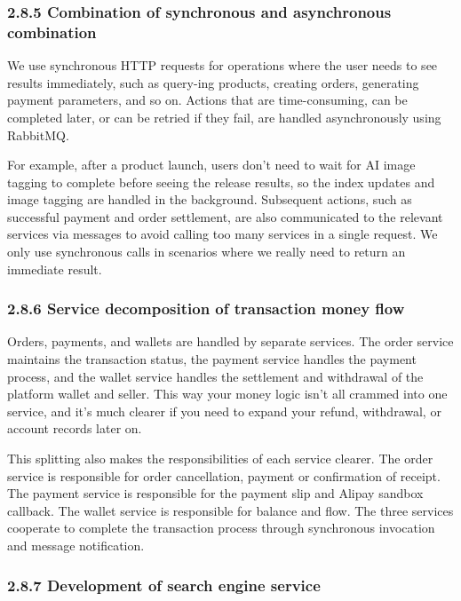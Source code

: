 \documentclass{article}
\begin{document}
\subsubsection{2.8.5 Combination of synchronous and asynchronous combination}

We use synchronous HTTP requests for operations where the user needs to see results immediately, such as query-ing products, creating orders, generating payment parameters, and so on. Actions that are time-consuming, can be completed later, or can be retried if they fail, are handled asynchronously using RabbitMQ.

For example, after a product launch, users don't need to wait for AI image tagging to complete before seeing the release results, so the index updates and image tagging are handled in the background. Subsequent actions, such as successful payment and order settlement, are also communicated to the relevant services via messages to avoid calling too many services in a single request. We only use synchronous calls in scenarios where we really need to return an immediate result.

\subsubsection{2.8.6 Service decomposition of transaction money flow}

Orders, payments, and wallets are handled by separate services. The order service maintains the transaction status, the payment service handles the payment process, and the wallet service handles the settlement and withdrawal of the platform wallet and seller. This way your money logic isn't all crammed into one service, and it's much clearer if you need to expand your refund, withdrawal, or account records later on.

This splitting also makes the responsibilities of each service clearer. The order service is responsible for order cancellation, payment or confirmation of receipt. The payment service is responsible for the payment slip and Alipay sandbox callback. The wallet service is responsible for balance and flow. The three services cooperate to complete the transaction process through synchronous invocation and message notification.

\subsubsection{2.8.7 Development of search engine service}
\end{document}
